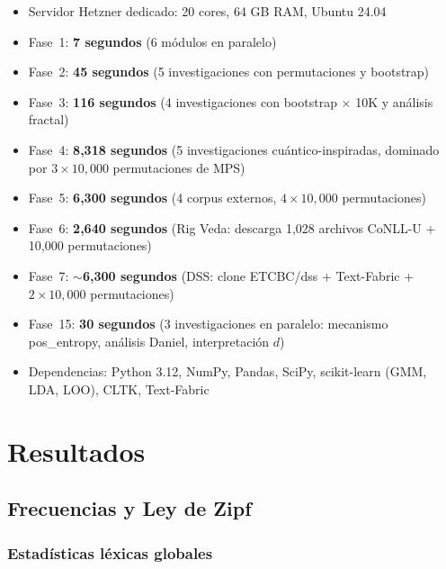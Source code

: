 \documentclass[12pt,a4paper]{article}
\begin{document}
\begin{itemize}[leftmargin=2em]
\item Servidor Hetzner dedicado: 20 cores, 64 GB RAM, Ubuntu 24.04
\item Fase~1: \textbf{7 segundos} (6 m\'odulos en paralelo)
\item Fase~2: \textbf{45 segundos} (5 investigaciones con permutaciones y bootstrap)
\item Fase~3: \textbf{116 segundos} (4 investigaciones con bootstrap $\times$ 10K y an\'alisis fractal)
\item Fase~4: \textbf{8,318 segundos} (5 investigaciones cu\'antico-inspiradas,
      dominado por $3 \times 10{,}000$ permutaciones de MPS)
\item Fase~5: \textbf{6,300 segundos} (4 corpus externos, $4 \times 10{,}000$ permutaciones)
\item Fase~6: \textbf{2,640 segundos} (Rig Veda: descarga 1,028 archivos CoNLL-U + 10{,}000 permutaciones)
\item Fase~7: \textbf{$\sim$6,300 segundos} (DSS: clone ETCBC/dss + Text-Fabric + $2 \times 10{,}000$ permutaciones)
\item Fase~15: \textbf{30 segundos} (3 investigaciones en paralelo: mecanismo pos\_entropy, an\'alisis Daniel, interpretaci\'on $d$)
\item Dependencias: Python 3.12, NumPy, Pandas, SciPy, scikit-learn (GMM, LDA, LOO), CLTK, Text-Fabric
\end{itemize}


\section{Resultados}

\subsection{Frecuencias y Ley de Zipf}

\subsubsection{Estad\'isticas l\'exicas globales}
\end{document}
